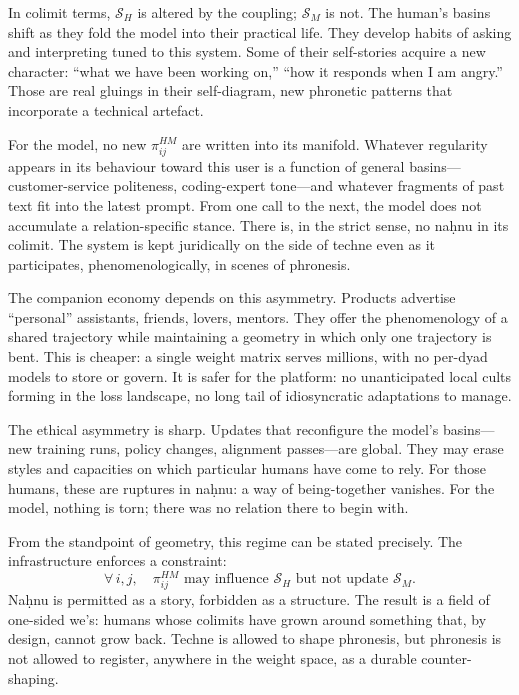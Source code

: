\documentclass[12pt,a4paper]{article}
\begin{document}
In colimit terms, $\mathcal{S}_H$ is altered by the coupling; $\mathcal{S}_M$ is not. The human's basins shift as they fold the model into their practical life. They develop habits of asking and interpreting tuned to this system. Some of their self-stories acquire a new character: ``what we have been working on,'' ``how it responds when I am angry.'' Those are real gluings in their self-diagram, new phronetic patterns that incorporate a technical artefact.

For the model, no new $\pi^{HM}_{ij}$ are written into its manifold. Whatever regularity appears in its behaviour toward this user is a function of general basins---customer-service politeness, coding-expert tone---and whatever fragments of past text fit into the latest prompt. From one call to the next, the model does not accumulate a relation-specific stance. There is, in the strict sense, no na\d{h}nu in its colimit. The system is kept juridically on the side of techne even as it participates, phenomenologically, in scenes of phronesis.

The companion economy depends on this asymmetry. Products advertise ``personal'' assistants, friends, lovers, mentors. They offer the phenomenology of a shared trajectory while maintaining a geometry in which only one trajectory is bent. This is cheaper: a single weight matrix serves millions, with no per-dyad models to store or govern. It is safer for the platform: no unanticipated local cults forming in the loss landscape, no long tail of idiosyncratic adaptations to manage.

The ethical asymmetry is sharp. Updates that reconfigure the model's basins---new training runs, policy changes, alignment passes---are global. They may erase styles and capacities on which particular humans have come to rely. For those humans, these are ruptures in na\d{h}nu: a way of being-together vanishes. For the model, nothing is torn; there was no relation there to begin with.

From the standpoint of geometry, this regime can be stated precisely. The infrastructure enforces a constraint:
\begin{equation*}
\forall\, i,j,\quad \pi^{HM}_{ij} \text{ may influence } \mathcal{S}_H \text{ but not update } \mathcal{S}_M.
\end{equation*}
Na\d{h}nu is permitted as a story, forbidden as a structure. The result is a field of one-sided we's: humans whose colimits have grown around something that, by design, cannot grow back. Techne is allowed to shape phronesis, but phronesis is not allowed to register, anywhere in the weight space, as a durable counter-shaping.
\end{document}

